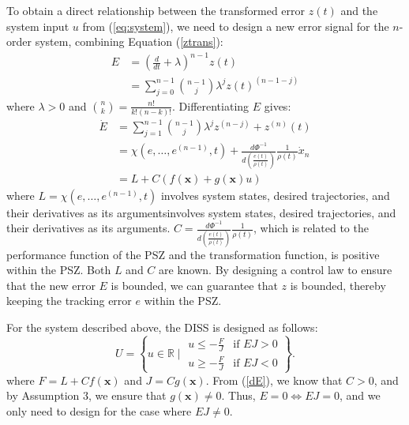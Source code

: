 \documentclass[preprint,12pt]{elsarticle}
\begin{document}
To obtain a direct relationship between the transformed error \(z(t)\) and the system input \(u\) from (\ref{eq:system}), we need to design a new error signal for the \(n\)-order system, combining Equation (\ref*{ztrans}):
\begin{equation}
    \begin{aligned}
    E & = \left(\frac{d}{dt}+\lambda\right)^{n-1}z(t) \\ 
    & = \sum_{j=0}^{n-1} \binom{n-1}{j} \lambda^j z(t)^{(n-1-j)}\label{E}
    \end{aligned}
\end{equation}
where \(\lambda>0\) and \(\binom{n}{k} = \frac{n!}{k!(n-k)!}\). 
Differentiating \(E\) gives:
\begin{equation}
    \begin{aligned}
        \dot{E} & = \sum_{j=1}^{n-1} \binom{n-1}{j} \lambda^j z^{(n-j)} + z^{(n)}(t) \\
                & = \chi(e,\dots,e^{(n-1)},t) + \frac{d \Phi^{-1}}{d \left(\frac{e(t)}{\rho(t)}\right)}\frac{1}{\rho(t)}\dot{x}_n \\
                & = L + C(f(\mathbf{x})+g(\mathbf{x})u)\label{dE}
    \end{aligned}
\end{equation}
where \(L = \chi(e,\dots,e^{(n-1)},t)\) involves system states, desired trajectories, and their derivatives as its argumentsinvolves system states, desired trajectories, and their derivatives as its arguments. \(C = \frac{d \Phi^{-1}}{d \left(\frac{e(t)}{\rho(t)}\right)}\frac{1}{ \rho(t)}\), which is related to the performance function of the PSZ and the transformation function, is positive within the PSZ. Both \(L\) and \(C\) are known. By designing a control law to ensure that the new error \(E\) is bounded, we can guarantee that \(z\) is bounded, thereby keeping the tracking error \(e\) within the PSZ.

For the system described above, the DISS is designed as follows:
\begin{equation}
U = \left\{ 
u \in \mathbb{R} \mid 
\begin{array}{ll}
u \leq -\frac{F}{J} & \text{if } EJ > 0 \\
u \geq -\frac{F}{J} & \text{if } EJ < 0 
\end{array} 
\right\}.\label{U}
\end{equation}
where \(F = L + Cf(\mathbf{x})\) and \(J = Cg(\mathbf{x})\). From (\ref{dE}), we know that \(C > 0\), and by Assumption 3, we ensure that \(g(\mathbf{x}) \neq 0\). Thus, \(E = 0 \iff EJ = 0\), and we only need to design for the case where \(EJ \neq 0\).
\end{document}
